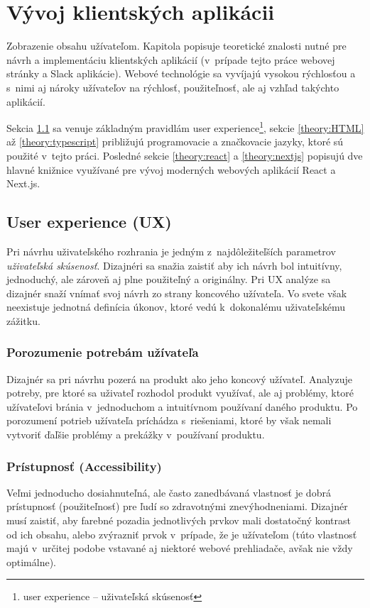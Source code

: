 \chapter{Vývoj klientských aplikácii}
\label{theory:client_dev}
Zobrazenie obsahu užívateľom. Kapitola popisuje teoretické znalosti nutné pre návrh a implementáciu klientských aplikácií (v~prípade tejto práce webovej stránky a Slack aplikácie). Webové technológie sa vyvíjajú vysokou rýchlosťou a s~nimi aj nároky užívateľov na rýchlosť, použiteľnosť, ale aj vzhľad takýchto aplikácií.

Sekcia \ref{theory:UX} sa venuje základným pravidlám user experience\footnote{user experience -- uživateľská skúsenosť}, sekcie \ref{theory:HTML} až \ref{theory:typescript} približujú programovacie a značkovacie jazyky, ktoré sú použité v~tejto práci. Posledné sekcie \ref{theory:react} a \ref{theory:nextjs} popisujú dve hlavné knižnice využívané pre vývoj moderných webových aplikácií React a Next.js.

\section{User experience (UX)}
\label{theory:UX}
Pri návrhu uživateľského rozhrania je jedným z~najdôležiteľších parametrov \emph{uživateľská skúsenosť}. Dizajnéri sa snažia zaistiť aby ich návrh bol intuitívny, jednoduchý, ale zároveň aj plne použiteľný a originálny. Pri UX analýze sa dizajnér snaží vnímať svoj návrh zo strany koncového užívateľa. Vo svete však neexistuje jednotná definícia úkonov, ktoré vedú k~dokonalému uživateľskému zážitku.

\subsection{Porozumenie potrebám užívateľa}
Dizajnér sa pri návrhu pozerá na produkt ako jeho koncový užívateľ. Analyzuje potreby, pre ktoré sa uživateľ rozhodol produkt využívať, ale aj problémy, ktoré užívateľovi bránia v~jednoduchom a intuitívnom používaní daného produktu. Po porozumení potrieb užívateľa príchádza s~riešeniami, ktoré by však nemali vytvoriť ďaľšie problémy a prekážky v~používaní produktu.

\subsection{Prístupnosť (Accessibility)}
Veľmi jednoducho dosiahnuteľná, ale často zanedbávaná vlastnosť je dobrá prístupnosť (použiteľnosť) pre ľudí so zdravotnými znevýhodneniami. Dizajnér musí zaistiť, aby farebné pozadia jednotlivých prvkov mali dostatočný kontrast od ich obsahu, alebo zvýrazniť prvok v~prípade, že je užívateľom (túto vlastnosť majú v~určitej podobe vstavané aj niektoré webové prehliadače, avšak nie vždy optimálne).


